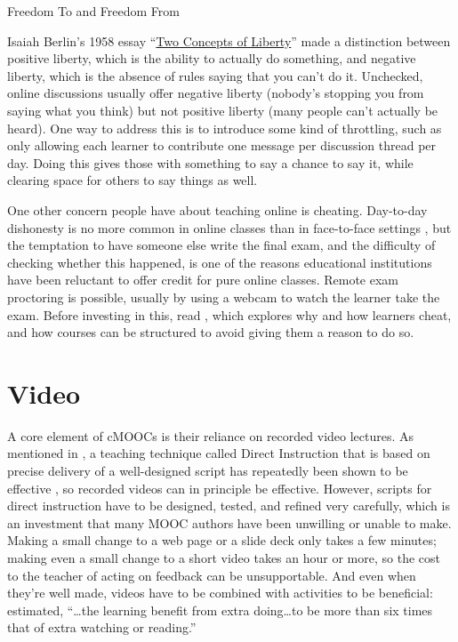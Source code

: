 \begin{callout}{Freedom To and Freedom From}

  Isaiah Berlin's 1958 essay
  ``\href{https://en.wikipedia.org/wiki/Two_Concepts_of_Liberty}{Two
    Concepts of Liberty}'' made a distinction between positive
  liberty, which is the ability to actually do something, and negative
  liberty, which is the absence of rules saying that you can't do
  it. Unchecked, online discussions usually offer negative liberty
  (nobody's stopping you from saying what you think) but not positive
  liberty (many people can't actually be heard). One way to address
  this is to introduce some kind of throttling, such as only allowing
  each learner to contribute one message per discussion thread per
  day. Doing this gives those with something to say a chance to say
  it, while clearing space for others to say things as well.

\end{callout}

One other concern people have about teaching online is cheating.
Day-to-day dishonesty is no more common in online classes than in
face-to-face settings \cite{Beck2014}, but the temptation to have
someone else write the final exam, and the difficulty of checking
whether this happened, is one of the reasons educational institutions
have been reluctant to offer credit for pure online classes. Remote
exam proctoring is possible, usually by using a webcam to watch the
learner take the exam.  Before investing in this, read
\cite{Lang2013}, which explores why and how learners cheat, and how
courses can be structured to avoid giving them a reason to do so.

\section{Video}\label{s:online-video}

A core element of cMOOCs is their reliance on recorded video lectures.
As mentioned in , a teaching technique called
Direct Instruction that is based on precise delivery of a
well-designed script has repeatedly been shown to be effective
\cite{Stoc2018}, so recorded videos can in principle be effective.
However, scripts for direct instruction have to be designed, tested,
and refined very carefully, which is an investment that many MOOC
authors have been unwilling or unable to make.  Making a small change
to a web page or a slide deck only takes a few minutes; making even a
small change to a short video takes an hour or more, so the cost to
the teacher of acting on feedback can be unsupportable.  And even when
they're well made, videos have to be combined with activities to be
beneficial: \cite{Koed2015} estimated, ``{\ldots}the learning benefit
from extra doing{\ldots}to be more than six times that of extra
watching or reading.''

